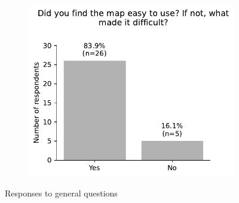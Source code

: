 \begin{appendices}
\begin{figure}[H]
\begin{subfigure}[b]{0.5\textwidth}
	\end{subfigure}%
	\begin{subfigure}[b]{0.5\textwidth}
		\centering
		\includegraphics[width=\textwidth]{visual/figures/survey/9.pdf}
	\end{subfigure}%
	\caption{Responses to general questions}
	\label{fig:general questions}
\end{figure}


\end{appendices}
